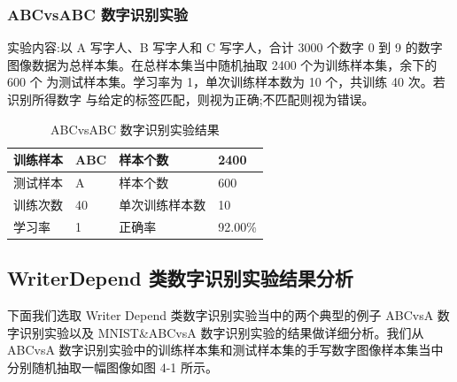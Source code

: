 \subsubsection{ABCvsABC 数字识别实验}

实验内容:以 A 写字人、B 写字人和 C 写字人，合计 3000 个数字 0 到 9 的数字 图像数据为总样本集。在总样本集当中随机抽取 2400 个为训练样本集，余下的 600 个 为测试样本集。学习率为 1，单次训练样本数为 10 个，共训练 40 次。若识别所得数字 与给定的标签匹配，则视为正确;不匹配则视为错误。

\begin{table}[!hpb]
  \centering
  \caption[指向一个表格的表目录索引]
    {ABCvsABC 数字识别实验结果}
  \label{tab:firstone}
  \begin{tabular}{C{8em}|C{4em}|C{10em}|C{6em}} \hline
    训练样本 & ABC     & 样本个数      & 2400     \\ \hline
    测试样本 & A       & 样本个数      & 600      \\ \hline
    训练次数 & 40      & 单次训练样本数 & 10       \\ \hline
    学习率   & 1       & 正确率        & 92.00\% \\ \hline
  \end{tabular}
\end{table}

\subsection{WriterDepend 类数字识别实验结果分析}

下面我们选取 Writer Depend 类数字识别实验当中的两个典型的例子 ABCvsA 数字识别实验以及 MNIST\&ABCvsA 数字识别实验的结果做详细分析。我们从 ABCvsA 数字识别实验中的训练样本集和测试样本集的手写数字图像样本集当中分别随机抽取一幅图像如图 4-1 所示。

